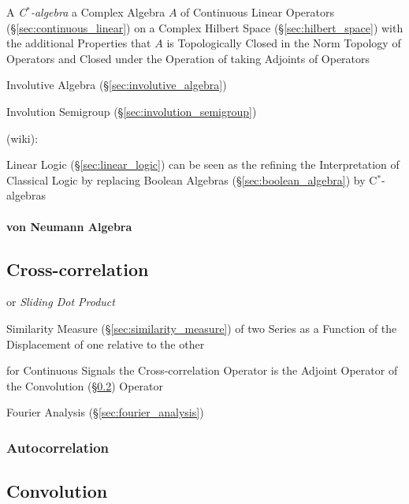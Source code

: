 A \emph{C$^*$-algebra} a Complex Algebra $A$ of Continuous Linear
Operators (\S\ref{sec:continuous_linear}) on a Complex Hilbert Space
(\S\ref{sec:hilbert_space}) with the additional Properties that $A$ is
Topologically Closed in the Norm Topology of Operators and Closed
under the Operation of taking Adjoints of Operators

Involutive Algebra (\S\ref{sec:involutive_algebra})

Involution Semigroup (\S\ref{sec:involution_semigroup})

(wiki):

Linear Logic (\S\ref{sec:linear_logic}) can be seen as the refining
the Interpretation of Classical Logic by replacing Boolean Algebras
(\S\ref{sec:boolean_algebra}) by C$^*$-algebras



\paragraph{von Neumann Algebra}\label{sec:vonneumann_algebra}\hfill



\subsection{Cross-correlation}\label{sec:cross_correlation}

or \emph{Sliding Dot Product}

Similarity Measure (\S\ref{sec:similarity_measure}) of two Series as a Function
of the Displacement of one relative to the other

for Continuous Signals the Cross-correlation Operator is the Adjoint Operator
of the Convolution (\S\ref{sec:convolution}) Operator

\fist Fourier Analysis (\S\ref{sec:fourier_analysis})



\subsubsection{Autocorrelation}\label{sec:autocorrelation}



\subsection{Convolution}\label{sec:convolution}

